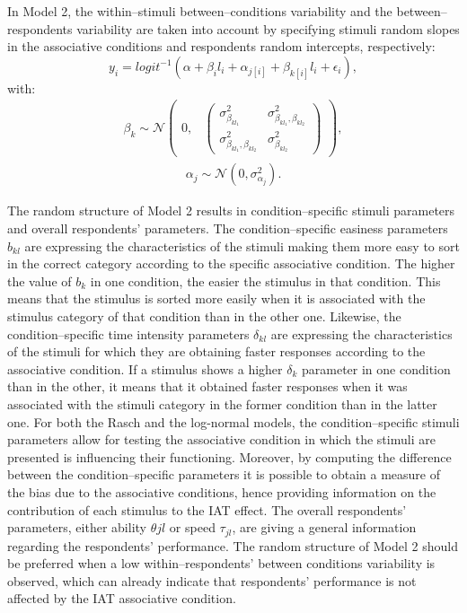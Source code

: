 \documentclass[12pt]{book}
\begin{document}
In Model 2, the within--stimuli between--conditions variability and the between--respondents variability are taken into account by specifying stimuli random slopes in the associative conditions and respondents random intercepts, respectively: 
%
\begin{equation}\label{Accuracy2}
y_{i} = logit^{-1}(\alpha + \beta_il_i + \alpha_{j[i]} +  \beta_{k[i]}l_{i} + \epsilon_{i}),
\end{equation}
with:
\begin{align}
\beta_{k} \sim  \mathcal{N}
\begin{pmatrix}
0,&
\begin{pmatrix}
\sigma_{\beta_{kl_1}}^2 & \sigma_{\beta_ {kl_1}, \beta_{kl_2}}^2 \\
\sigma_{{\beta_{kl_1}}, \beta_{kl_2}}^2& \sigma_{\beta_{kl_2}}^2
\end{pmatrix}
\end{pmatrix},
\end{align}
\begin{align}
	\alpha_{j} \sim  \mathcal{N} (0, \sigma_{\alpha_j}^2). 
\end{align}

The random structure of Model 2 results in condition--specific stimuli parameters and overall respondents' parameters.  The condition--specific easiness parameters $b_{kl}$ are expressing the characteristics of the stimuli making them more easy to sort in the correct category according to the specific associative condition. The higher the value of $b_k$ in one condition, the easier the stimulus in that condition. This means that the stimulus is sorted more easily when it is associated with the stimulus category of that condition than in the other one. Likewise, the condition--specific time intensity parameters $\delta_{kl}$ are expressing the characteristics of the stimuli for which they are obtaining faster responses according to the associative condition. If a stimulus shows a higher $\delta_{k}$ parameter in one condition than in the other, it means that it obtained faster responses when it was associated with the stimuli category in the former condition than in the latter one. For both the Rasch and the log-normal models, the condition--specific stimuli parameters allow for testing the associative condition in which the stimuli are presented is influencing their functioning. Moreover, by computing the difference between the condition--specific parameters it is possible to obtain a measure of the bias due to the associative conditions, hence providing information on the contribution of each stimulus to the IAT effect. 
The overall respondents' parameters, either ability $\theta{jl}$ or speed $\tau_{jl}$, are giving a general information regarding the respondents' performance. 
The random structure of Model 2 should be preferred when a low within--respondents' between conditions variability is observed, which can already indicate that respondents' performance is not affected by the IAT associative condition. 
\end{document}
